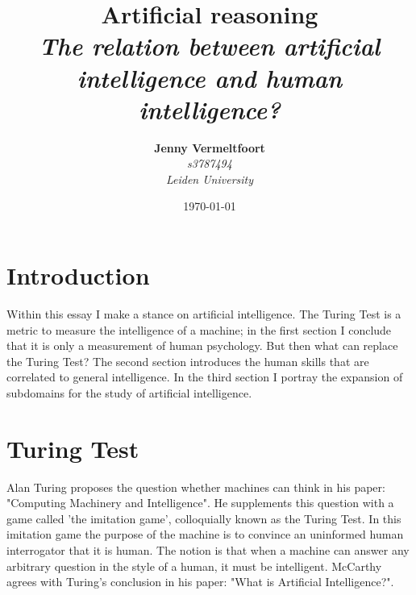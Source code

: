 \documentclass[10pt]{diazessay} %
\title{\textbf{Artificial reasoning} \\ {\Large\itshape The relation between artificial intelligence and human intelligence?}} %
\author{\textbf{Jenny Vermeltfoort}\\ \textit{s3787494} \\ \textit{Leiden University} } %
\date{\today} %
\begin{document}
\maketitle %






\section*{Introduction}
Within this essay I make a stance on artificial intelligence. The Turing Test is a metric to measure the intelligence of a machine; in the first section I conclude that it is only a measurement of human psychology. But then what can replace the Turing Test? The second section introduces the human skills that are correlated to general intelligence. In the third section I portray the expansion of subdomains for the study of artificial intelligence.




\section*{Turing Test}
Alan Turing proposes the question whether machines can think in his paper: "Computing Machinery and Intelligence"\cite{turing}. He supplements this question with a game called 'the imitation game', colloquially known as the Turing Test. In this imitation game the purpose of the machine is to convince an uninformed human interrogator that it is human. The notion is that when a machine can answer any arbitrary question in the style of a human, it must be intelligent. McCarthy agrees with Turing's conclusion in his paper: "What is Artificial Intelligence?"\cite{mcarthy}.
\end{document}
